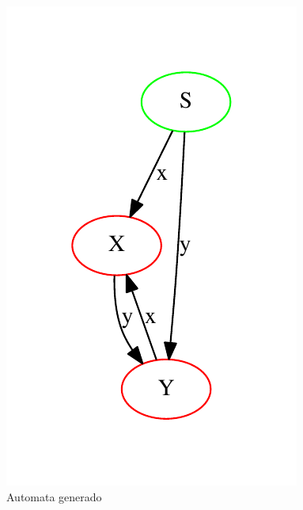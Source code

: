 \documentclass[a4paper,12pt]{article}
\begin{document}
    \begin{figure}[h]
     \centering
     \includegraphics[scale = 2]{eje.pdf}
     \caption{Automata generado}
    \end{figure}
\end{document}
